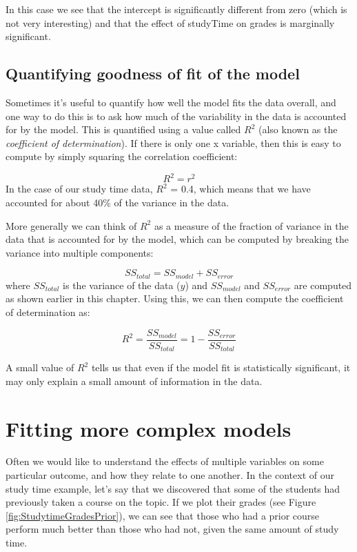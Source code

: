 \documentclass[]{book}
\theoremstyle{definition}
\theoremstyle{definition}
\theoremstyle{definition}
\theoremstyle{remark}
\begin{document}
In this case we see that the intercept is significantly different from
zero (which is not very interesting) and that the effect of studyTime on
grades is marginally significant.

\subsection{Quantifying goodness of fit of the
model}\label{quantifying-goodness-of-fit-of-the-model}

Sometimes it's useful to quantify how well the model fits the data
overall, and one way to do this is to ask how much of the variability in
the data is accounted for by the model. This is quantified using a value
called \(R^2\) (also known as the \emph{coefficient of determination}).
If there is only one x variable, then this is easy to compute by simply
squaring the correlation coefficient:

\[
R^2 = r^2
\] In the case of our study time data, \(R^2\) = 0.4, which means that
we have accounted for about 40\% of the variance in the data.

More generally we can think of \(R^2\) as a measure of the fraction of
variance in the data that is accounted for by the model, which can be
computed by breaking the variance into multiple components:

\[
SS_{total} = SS_{model} + SS_{error}
\] where \(SS_{total}\) is the variance of the data (\(y\)) and
\(SS_{model}\) and \(SS_{error}\) are computed as shown earlier in this
chapter. Using this, we can then compute the coefficient of
determination as:

\[
R^2 = \frac{SS_{model}}{SS_{total}} = 1 - \frac{SS_{error}}{SS_{total}}
\]

A small value of \(R^2\) tells us that even if the model fit is
statistically significant, it may only explain a small amount of
information in the data.

\section{Fitting more complex models}\label{fitting-more-complex-models}

Often we would like to understand the effects of multiple variables on
some particular outcome, and how they relate to one another. In the
context of our study time example, let's say that we discovered that
some of the students had previously taken a course on the topic. If we
plot their grades (see Figure \ref{fig:StudytimeGradesPrior}), we can
see that those who had a prior course perform much better than those who
had not, given the same amount of study time.
\end{document}
